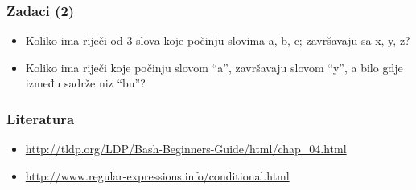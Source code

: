 \documentclass[table,usenames,dvipsnames]{beamer}
\begin{document}
\begin{frame}[t]
\frametitle{Zadaci (2)}
\begin{itemize}
  \item Koliko ima riječi od 3 slova koje počinju slovima a, b, c; 
        završavaju sa x, y, z?
  \item Koliko ima riječi koje počinju slovom ``a'', završavaju slovom 
        ``y'', a bilo gdje između sadrže niz ``bu''?
\end{itemize}
\end{frame}

\begin{frame}[t]
\frametitle{Literatura}
\begin{itemize}
  \item[] \small
          \url{http://tldp.org/LDP/Bash-Beginners-Guide/html/chap_04.html} 
  \item[] \small\url{http://www.regular-expressions.info/conditional.html}
\end{itemize}
\end{frame}
\end{document}
